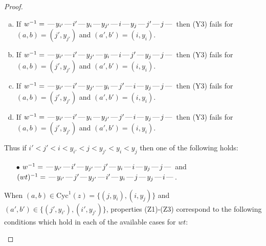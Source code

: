 \documentclass[10pt]{article}
\theoremstyle{definition}
\theoremstyle{definition}
\def\dash{\text{\hspace{0.5mm}---\hspace{0.5mm}}}
\def\Cyc{\mathrm{Cyc}}
\begin{document}
\begin{proof}
\begin{enumerate}
\begin{enumerate}[(a)]
\item If $w^{-1} = \dash y_{i'}\dash i'\dash y_i\dash y_{j'}\dash i\dash y_j\dash j'\dash j\dash $ then (Y3) fails for $(a,b)=(j',y_{j'})$ and $(a',b')=(i,y_i)$.
\item If $w^{-1} = \dash y_{i'}\dash i'\dash y_{j'}\dash y_i\dash i\dash j'\dash y_j\dash j\dash $ then (Y3) fails for $(a,b)=(j',y_{j'})$ and $(a',b')=(i,y_i)$.
\item If $w^{-1} = \dash y_{i'}\dash i'\dash y_{j'}\dash y_i\dash j'\dash i\dash y_j\dash j\dash $ then (Y3) fails for $(a,b)=(j',y_{j'})$ and $(a',b')=(i,y_i)$.
\item If $w^{-1} = \dash y_{i'}\dash i'\dash y_i\dash y_{j'}\dash j'\dash i\dash y_j\dash j\dash $ then (Y3) fails for $(a,b)=(j',y_{j'})$ and $(a',b')=(i,y_i)$.
\end{enumerate}
Thus if $i' < j' < i < y_{i'} < j < y_{j'} < y_i < y_j$ then one of the following holds:
\begin{enumerate}
\item[$\bullet$] $w^{-1} = \dash y_{i'}\dash i'\dash y_{j'}\dash j'\dash y_i\dash i\dash y_j\dash j\dash $ and $(wt)^{-1} = \dash y_{i'}\dash j'\dash y_{j'}\dash i'\dash y_i\dash j\dash y_j\dash i\dash $.
\end{enumerate}
When $(a,b)\in\Cyc^1(z)=\{(j,y_i),(i,y_j)\}$ and $(a',b')\in\{(j',y_{i'}),(i',y_{j'})\}$,
properties (Z1)-(Z3) correspond to the following conditions which
hold in each of the available cases for $wt$:
\end{enumerate}
\end{proof}
\end{document}
